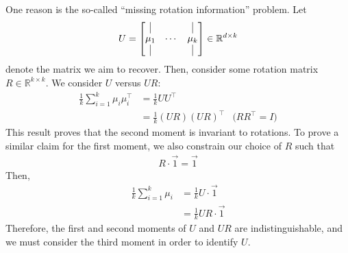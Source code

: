 One reason is the so-called ``missing rotation information'' problem. Let 
\begin{equation}
    U =\begin{bmatrix} \vrule & & \vrule \\ \mu_1 & \cdots & \mu_k \\ \vrule & & \vrule \end{bmatrix} \in\mathbb{R}^{d\times k}
\end{equation}
denote the matrix we aim to recover. Then, consider some rotation matrix $R\in\mathbb{R}^{k\times k}$. We consider $U$ versus $U R$:
\begin{align}
    \frac{1}{k}\sum_{i=1}^k\mu_i\mu_i^\top &= \frac{1}{k}U U^\top \\
    &=\frac{1}{k}(U R)(U R)^\top &\text{($RR^\top=I$)}
\end{align}
This result proves that the second moment is invariant to rotations. To prove a similar claim for the first moment, we also constrain our choice of $R$ such that
\begin{align}
    R\cdot\Vec{1}=\Vec{1}
\end{align}
Then,
\begin{align}
    \frac{1}{k}\sum_{i=1}^k\mu_i&=\frac{1}{k} U \cdot\Vec{1} \\
    &=\frac{1}{k} U R\cdot\Vec{1}
\end{align}
Therefore, the first and second moments of $U$ and $U R$ are indistinguishable, and we must consider the third moment in order to identify $U$.